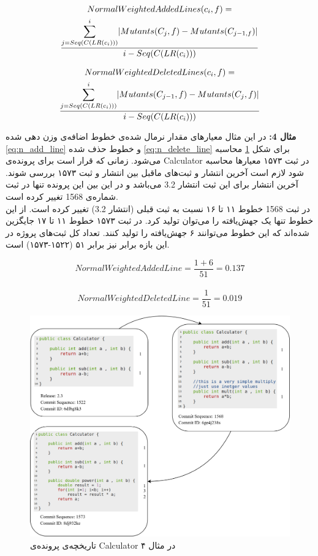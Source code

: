  
\begin{multline} \label{eq:n_add_line}
NormalWeightedAddedLines(c_i,f) =\\ \frac{ \mathlarger{\sum}\limits_{j=Seq(C(LR(c_i)))}^{i} |Mutants(C_j,f) - Mutants(C_{j-1,f})|
	}{i - Seq(C(LR(c_i)))}
\end{multline}
 

 
\begin{multline} \label{eq:n_delete_line}
NormalWeightedDeletedLines(c_i,f) =\\ \frac{ \mathlarger{\sum}\limits_{j=Seq(C(LR(c_i)))}^{i} |Mutants(C_{j-1},f) - Mutants(C_j,f)|
}{i - Seq(C(LR(c_i)))}
\end{multline}
 

 
\textbf{مثال 4:}
در این مثال معیار‌های مقدار نرمال شده‌ی خطوط اضافه‌ی وزن دهی شده \ref{eq:n_add_line} و خطوط حذف شده \ref{eq:n_delete_line} برای شکل \ref{fig:example3} محاسبه می‌شود. زمانی که قرار است برای پرونده‌ی Calculator  در ثبت ۱۵۷۳ معیارها محاسبه شود لازم است آخرین انتشار و ثبت‌های ماقبل بین انتشار و ثبت ۱۵۷۳ بررسی شوند. آخرین انتشار برای این ثبت انتشار  3.2 می‌باشد و  در این بین این پرونده تنها در ثبت شماره‌ی 1568 تغییر کرده است. \\
در ثبت 1568 خطوط ۱۱ تا ۱۶ نسبت به ثبت قبلی (انتشار 3.2) تغییر کرده است. از این خطوط تنها یک جهش‌یافته را می‌توان تولید کرد. در ثبت ۱۵۷۳ خطوط ۱۱ تا ۱۷ جایگزین شده‌اند که این خطوط می‌توانند ۶ جهش‌یافته را تولید کنند. تعداد کل ثبت‌های پروژه در این بازه  برابر نیز برابر ۵۱ 
(۱۵۲۲-۱۵۷۳) 
است. 
\begin{latin}
\[
NormalWeightedAddedLine = \frac{1+6}{51} = 0.137\]\\
\[
NormalWeightedDeletedLine = \frac{1}{51} = 0.019
\]
\end{latin}



\begin{figure}[H]
	\centering
	\includegraphics[width=1\textwidth]{img/method/example3.png}
	\caption{ تاریخچه‌ی پرونده‌ی Calculator در مثال ۴}
	\label{fig:example3}
\end{figure}

